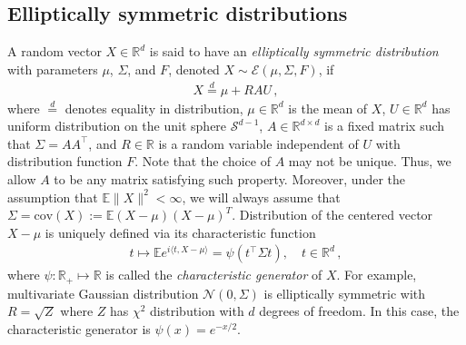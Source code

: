\documentclass[12pt]{article}
\newcommand\cov{\mathrm{cov}}
\def\l{\left}
\def\r{\right}
\newcommand{\mb}{\mathbb}
\theoremstyle{thmstyletwo}%
\theoremstyle{thmstylethree}%
\begin{document}
\subsection{Elliptically symmetric distributions}
\label{sec:elliptical-symmetric-distribution}

A random vector $X \in \mb R^d$ is said to have an \textit{elliptically symmetric distribution} with parameters $\mu$, $\Sigma$, and $F$, denoted $X \sim \mathcal{E}\l(\mu, \Sigma, F\r)$, if
\begin{align*}
    X \overset{d}{=} \mu + RAU\,,
\end{align*}
where $\overset{d}{=}$ denotes equality in distribution, $\mu \in \mb R^d$ is the mean of $X$, $U \in \mb R^d$ has uniform distribution on the unit sphere $\mathcal{S}^{d-1}$, $A \in \mb R^{d \times d}$ is a fixed matrix such that $\Sigma = AA^\top$, and $R \in \mb R$ is a random variable independent of $U$ with distribution function $F$. Note that the choice of $A$ may not be unique. Thus, we allow $A$ to be any matrix satisfying such property. Moreover, under the assumption that $\mb E \|X\|^2 < \infty$, we will always assume that $\Sigma = \cov(X):=\mb E(X-\mu)(X-\mu)^T$. Distribution of the centered vector $X-\mu$ is uniquely defined via its characteristic function
\begin{align*}
    t \mapsto \mb E e^{i\langle t,X-\mu\rangle}=\psi(t^\top \Sigma t), \quad t \in \mb R^d\,,
\end{align*}
where $\psi : \mb R_+ \mapsto \mb R$ is called the \emph{characteristic generator} of $X$.
 For example, multivariate Gaussian distribution $\mathcal{N}(0, \Sigma)$ is elliptically symmetric with $R = \sqrt{Z}$ where $Z$ has $\chi^2$ distribution with $d$ degrees of freedom. In this case, the characteristic generator is $\psi(x) = e^{-x/2}$.
\end{document}
